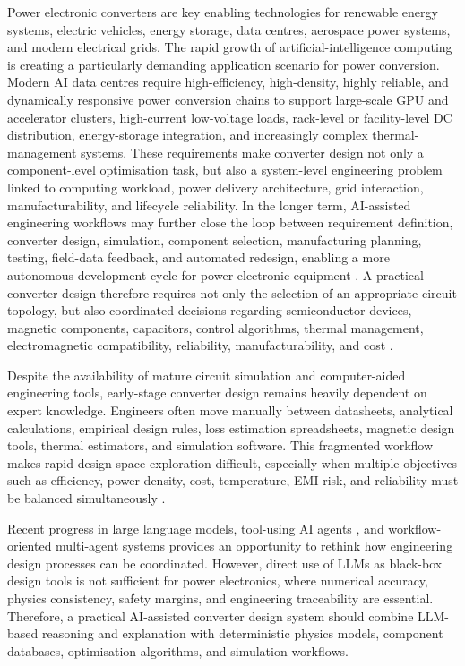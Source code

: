 Power electronic converters are key enabling technologies for renewable energy systems, electric vehicles, energy storage, data centres, aerospace power systems, and modern electrical grids. The rapid growth of artificial-intelligence computing is creating a particularly demanding application scenario for power conversion. Modern AI data centres \cite{11424256,11515260} require high-efficiency, high-density, highly reliable, and dynamically responsive power conversion chains to support large-scale GPU and accelerator clusters, high-current low-voltage loads, rack-level or facility-level DC distribution, energy-storage integration, and increasingly complex thermal-management systems. These requirements make converter design not only a component-level optimisation task, but also a system-level engineering problem linked to computing workload, power delivery architecture, grid interaction, manufacturability, and lifecycle reliability. In the longer term, AI-assisted engineering workflows may further close the loop between requirement definition, converter design, simulation, component selection, manufacturing planning, testing, field-data feedback, and automated redesign, enabling a more autonomous development cycle for power electronic equipment \cite{Yao2023ReAct,Schick2023Toolformer,Wu2023AutoGen}. A practical converter design therefore requires not only the selection of an appropriate circuit topology, but also coordinated decisions regarding semiconductor devices, magnetic components, capacitors, control algorithms, thermal management, electromagnetic compatibility, reliability, manufacturability, and cost \cite{10751872}.

Despite the availability of mature circuit simulation and computer-aided engineering tools, early-stage converter design remains heavily dependent on expert knowledge. Engineers often move manually between datasheets, analytical calculations, empirical design rules, loss estimation spreadsheets, magnetic design tools, thermal estimators, and simulation software. This fragmented workflow makes rapid design-space exploration difficult, especially when multiple objectives such as efficiency, power density, cost, temperature, EMI risk, and reliability must be balanced simultaneously \cite{9152082,9209087,9062664}.

Recent progress in large language models, tool-using AI agents \cite{Yao2023ReAct,Schick2023Toolformer}, and workflow-oriented multi-agent systems \cite{Wu2023AutoGen} provides an opportunity to rethink how engineering design processes can be coordinated. However, direct use of LLMs as black-box design tools is not sufficient for power electronics, where numerical accuracy, physics consistency, safety margins, and engineering traceability are essential. Therefore, a practical AI-assisted converter design system should combine LLM-based reasoning and explanation with deterministic physics models, component databases, optimisation algorithms, and simulation workflows.

